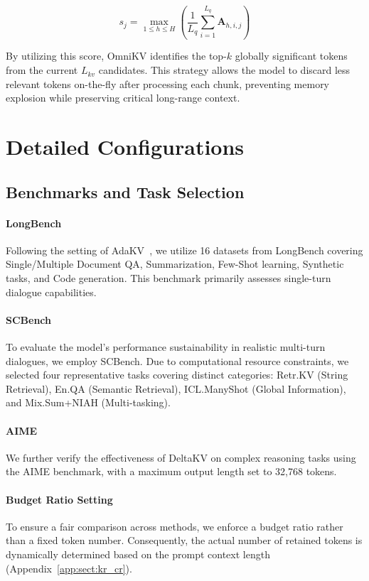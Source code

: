 \begin{equation}
    s_j = \max_{1 \le h \le H} \left( \frac{1}{L_q} \sum_{i=1}^{L_q} \mathbf{A}_{h, i, j} \right)
\end{equation}

By utilizing this score, OmniKV identifies the top-$k$ globally significant tokens from the current $L_{kv}$ candidates.
This strategy allows the model to discard less relevant tokens on-the-fly after processing each chunk, preventing memory explosion while preserving critical long-range context.


\section{Detailed Configurations}


\subsection{Benchmarks and Task Selection}
\label{app:sect:eval_details}

\paragraph{LongBench} Following the setting of AdaKV~\cite{feng2025adakv}, we utilize 16 datasets from LongBench covering Single/Multiple Document QA, Summarization, Few-Shot learning, Synthetic tasks, and Code generation. This benchmark primarily assesses single-turn dialogue capabilities.

\paragraph{SCBench} To evaluate the model's performance sustainability in realistic multi-turn dialogues, we employ SCBench. Due to computational resource constraints, we selected four representative tasks covering distinct categories: Retr.KV (String Retrieval), En.QA (Semantic Retrieval), ICL.ManyShot (Global Information), and Mix.Sum+NIAH (Multi-tasking).

\paragraph{AIME} We further verify the effectiveness of DeltaKV on complex reasoning tasks using the AIME benchmark, with a maximum output length set to 32,768 tokens.

\paragraph{Budget Ratio Setting} To ensure a fair comparison across methods, we enforce a budget ratio rather than a fixed token number. Consequently, the actual number of retained tokens is dynamically determined based on the prompt context length (Appendix~\ref{app:sect:kr_cr}).


